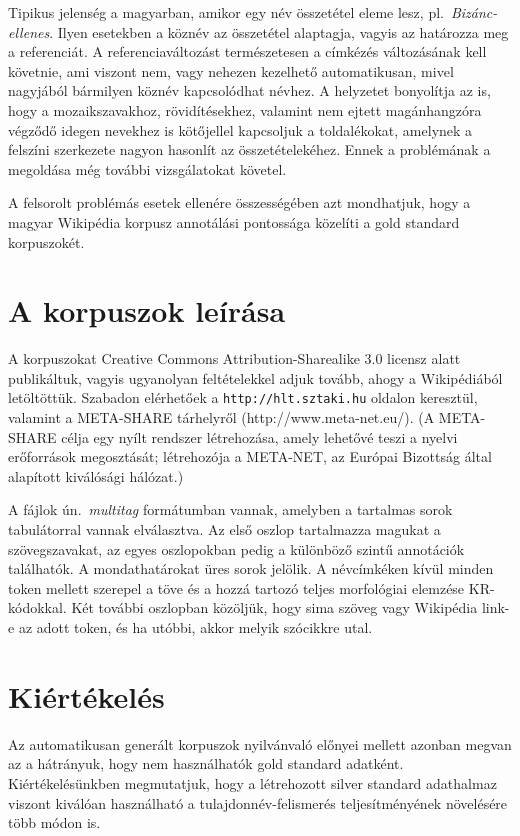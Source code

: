 \documentclass{llncs}
\begin{document}
Tipikus jelenség a magyarban, amikor egy név összetétel eleme lesz, pl.~\textit{Bizánc-ellenes}. Ilyen esetekben a köznév az összetétel alaptagja, vagyis az határozza meg a referenciát. A referenciaváltozást természetesen a címkézés változásának kell követnie, ami viszont nem, vagy nehezen kezelhető automatikusan, mivel nagyjából bármilyen köznév kapcsolódhat névhez. A helyzetet bonyolítja az is, hogy a mozaikszavakhoz, rövidítésekhez, valamint nem ejtett magánhangzóra végződő idegen nevekhez is kötőjellel kapcsoljuk a toldalékokat, amelynek a felszíni szerkezete nagyon hasonlít az összetételekéhez. Ennek a problémának a megoldása még további vizsgálatokat követel. 

A felsorolt problémás esetek ellenére összességében azt mondhatjuk, hogy a magyar Wikipédia korpusz annotálási pontossága közelíti a gold standard korpuszokét. %

\section{A korpuszok leírása}
\label{desc}

A korpuszokat Creative Commons Attribution-Sharealike 3.0 licensz alatt publikáltuk, vagyis ugyanolyan feltételekkel adjuk tovább, ahogy a Wikipédiából letöltöttük. Szabadon elérhetőek a \texttt{http://hlt.sztaki.hu} oldalon keresztül, valamint a META-SHARE tárhelyről (http://www.meta-net.eu/). (A META-SHARE célja egy nyílt rendszer létrehozása, amely lehetővé teszi a nyelvi erőforrások megosztását; létrehozója a META-NET, az Európai Bizottság által alapított kiválósági hálózat.) 

A fájlok ún.~\emph{multitag} formátumban vannak, amelyben a tartalmas sorok tabulátorral vannak elválasztva. Az első oszlop tartalmazza magukat a szövegszavakat, az egyes oszlopokban pedig a különböző szintű annotációk találhatók. A mondathatárokat üres sorok jelölik. A névcímkéken kívül minden token mellett szerepel a töve és a hozzá tartozó teljes morfológiai elemzése KR-kódokkal. Két további oszlopban közöljük, hogy sima szöveg vagy Wikipédia link-e az adott token, és ha utóbbi, akkor melyik szócikkre utal. 

\section{Kiértékelés}
\label{results}

Az automatikusan generált korpuszok nyilvánvaló előnyei mellett azonban megvan az a hátrányuk, hogy nem használhatók gold standard adatként. Kiértékelésünkben megmutatjuk, hogy a létrehozott silver standard adathalmaz viszont kiválóan használható a tulajdonnév-felismerés teljesítményének növelésére több módon is. 
\end{document}

